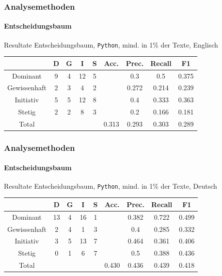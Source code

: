 \begin{frame}
\frametitle{Analysemethoden}
\framesubtitle{Entscheidungsbaum}
Resultate Entscheidungsbaum, \texttt{Python}, mind. in 1\% der Texte, Englisch
\begin{center}
\begin{tabular}{|c|c|c|c|c|c|c|c|c|}
\hline
 &  D 	& G	& I & S	& Acc.	& Prec. & Recall	& F1\\
\hline
Dominant &     9 & 4 & 12 & 5& &0.3 & 0.5 & 0.375 \\
Gewissenhaft & 2 & 3 & 4 & 2&& 0.272 & 0.214 & 0.239 \\
Initiativ &    5 & 5 & 12 & 8&& 0.4 & 0.333 & 0.363\\
Stetig &       2 & 2 & 8 & 3&& 0.2 & 0.166& 0.181 \\
\hline
Total 	&		&		& &	& 0.313		& 0.293 & 0.303 & 0.289 \\
\hline
\end{tabular}
\end{center}
\end{frame}
\begin{frame}
\frametitle{Analysemethoden}
\framesubtitle{Entscheidungsbaum}
Resultate Entscheidungsbaum, \texttt{Python}, mind. in 1\% der Texte, Deutsch
\begin{center}
\begin{tabular}{|c|c|c|c|c|c|c|c|c|}
\hline
 &  D 	& G	& I & S	& Acc.	& Prec. & Recall	& F1\\
\hline
Dominant &     13 & 4 & 16 & 1&&  0.382 & 0.722 & 0.499 \\
Gewissenhaft & 2 & 4 & 1 & 3 &&  0.4 & 0.285 & 0.332  \\
Initiativ &    3 & 5 & 13 & 7&& 0.464 & 0.361 & 0.406  \\
Stetig &       0 & 1 & 6 & 7 &&  0.5 & 0.388 & 0.436 \\
\hline
Total 	&		&		& & 		&  0.430			&  0.436 &0.439 & 0.418 \\
\hline
\end{tabular}
\end{center}
\end{frame}
